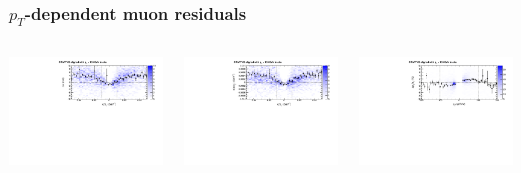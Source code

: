 \documentclass[compress]{beamer}
\begin{document}
\begin{frame}
\frametitle{$p_T$-dependent muon residuals}

\begin{columns}

\includegraphics[width=\linewidth]{residuals_real.pdf}

\includegraphics[width=\linewidth]{curvature_real.pdf}

\includegraphics[width=\linewidth]{momenta_real.pdf}


\end{columns}
\end{frame}
\end{document}
